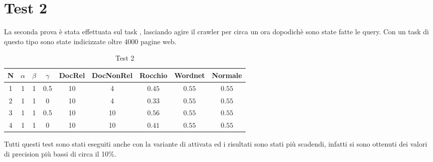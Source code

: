 \section{Test 2}
La seconda prova è stata effettuata sul task , lasciando agire il crawler per circa un ora dopodichè sono state fatte le query. Con un task di questo tipo sono state indicizzate oltre 4000 pagine web.
\begin{table}[H]
\begin{center}
\begin{tabular}{||c|c|c|c|c|c|c|c|c||}
\hline
N	&$\alpha$	&$\beta$	&$\gamma$	&DocRel		&DocNonRel	&Rocchio	&Wordnet	&Normale	\\
\hline
\hline
1	&1			&1			&0.5		&10			&4			&$0.45$		&$0.55$		&$0.55$	\\
\hline
2	&1			&1			&0			&10			&4			&$0.33$		&$0.55$		&$0.55$	\\
\hline
3	&1			&1			&0.5		&10			&10			&$0.56$		&$0.55$		&$0.55$	\\
\hline
4	&1			&1			&0			&10			&10			&$0.41$		&$0.55$		&$0.55$	\\
\hline
\end{tabular}
\end{center}
\caption{Test 2}
\label{test_2}
\end{table}
Tutti questi test sono stati eseguiti anche con la variante di  attivata ed i risultati sono stati più scadendi, infatti si sono ottenuti dei valori di precision più bassi di circa il 10\%.